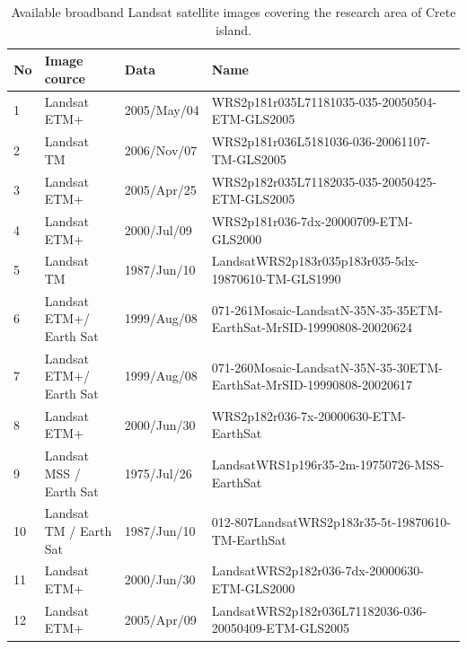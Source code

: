 \documentclass[11pt]{article}
\begin{document}
\begin{appendices}
\begin{table}[H]
	\caption{Available broadband Landsat satellite images covering the research area of Crete island.}\label{tab:34}
	\centering
	 \begin{tabular}{| p{1cm} | p{3cm} | p{2cm} | p{5cm} |}
	    \hline
		    \textbf{No} & \textbf{Image cource} & \textbf{Data} & \textbf{Name} \\ \hline \hline
		     1 & Landsat ETM+ & 2005/May/04 & WRS2p181r035L71181035-035-20050504-ETM-GLS2005 \\ \hline
		     2 & Landsat TM & 2006/Nov/07 & WRS2p181r036L5181036-036-20061107-TM-GLS2005 \\ \hline
		     3 & Landsat ETM+ & 2005/Apr/25 & WRS2p182r035L71182035-035-20050425-ETM-GLS2005 \\ \hline
		     4 & Landsat ETM+ & 2000/Jul/09 & WRS2p181r036-7dx-20000709-ETM-GLS2000 \\ \hline
		     5 & Landsat TM & 1987/Jun/10 & LandsatWRS2p183r035p183r035-5dx-19870610-TM-GLS1990 \\ \hline
		     6 & Landsat ETM+/ Earth Sat & 1999/Aug/08 & 071-261Mosaic-LandsatN-35N-35-35ETM-EarthSat-MrSID-19990808-20020624 \\ \hline
		     7 & Landsat ETM+/ Earth Sat & 1999/Aug/08 & 071-260Mosaic-LandsatN-35N-35-30ETM-EarthSat-MrSID-19990808-20020617 \\ \hline
		     8 & Landsat ETM+ & 2000/Jun/30 & WRS2p182r036-7x-20000630-ETM-EarthSat \\ \hline
		     9 & Landsat MSS / Earth Sat & 1975/Jul/26 & LandsatWRS1p196r35-2m-19750726-MSS-EarthSat \\ \hline
		    10 & Landsat TM / Earth Sat & 1987/Jun/10 & 012-807LandsatWRS2p183r35-5t-19870610-TM-EarthSat \\ \hline
		    11 & Landsat ETM+ & 2000/Jun/30 & LandsatWRS2p182r036-7dx-20000630-ETM-GLS2000 \\ \hline
		    12 & Landsat ETM+ & 2005/Apr/09 & LandsatWRS2p182r036L71182036-036-20050409-ETM-GLS2005 \\ \hline
	  \end{tabular}	
\end{table}
\pagebreak
\newpage


\end{appendices}
\end{document}
